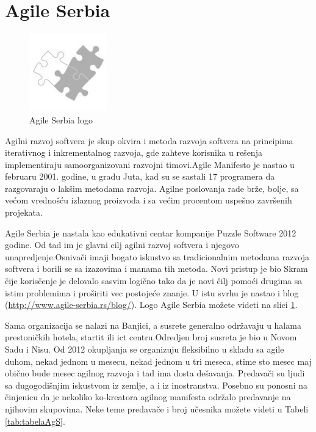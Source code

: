 \documentclass[a4paper]{article}
\begin{document}
{\section{Agile Serbia}
\label{sec:agsrb}

\begin{figure}[h]
  \centering
  \includegraphics[width=0.3\textwidth]{agile_srb.png}
  \caption{Agile Serbia logo}
  \label{fig:agslogo}
\end{figure}

Agilni razvoj softvera je skup okvira i metoda razvoja softvera na principima iterativnog i inkrementalnog razvoja, gde zahteve korisnika u rešenja implementiraju samoorganizovani razvojni timovi.Agile Manifesto je nastao u februaru 2001. godine, u gradu Juta, kad su se sastali 17 programera da razgovaraju o lakšim metodama razvoja. Agilne poslovanja rade brže, bolje, sa većom vrednošću izlaznog proizvoda i sa većim procentom uspešno završenih projekata.

Agile Serbia je nastala kao edukativni centar kompanije Puzzle Software 2012 godine. Od tad im je glavni cilj agilni razvoj softvera i njegovo unapredjenje.Osnivači imaji bogato iskustvo sa tradicionalnim metodama razvoja softvera i borili se sa izazovima i manama tih metoda. Novi pristup je bio Skram čije korisčenje je delovalo sasvim logično tako da je novi čilj pomoći drugima sa istim problemima i proširiti vec postojeće znanje. U istu svrhu je nastao i blog (\url{http://www.agile-serbia.rs/blog/}). Logo Agile Serbia možete videti na slici \ref{fig:agslogo}.

Sama organizacija se nalazi na Banjici, a susrete generalno održavaju u halama prestoničkih hotela, startit ili ict centru.Odredjen broj susreta je bio u Novom Sadu i Nisu. Od 2012 okupljanja se organizuju fleksibilno u skladu sa agile duhom, nekad jednom u mesecu, nekad jednom u tri meseca, stime sto mesec maj obično bude mesec agilnog razvoja i tad ima dosta dešavanja. Predavači su ljudi sa dugogodišnjim iskustvom iz zemlje, a i iz inostranstva. Posebno su ponosni na činjenicu da je nekoliko ko-kreatora agilnog manifesta održalo predavanje na njihovim skupovima. Neke teme predavače i broj učesnika možete videti u Tabeli \ref{tab:tabelaAgS}.

}
\end{document}
